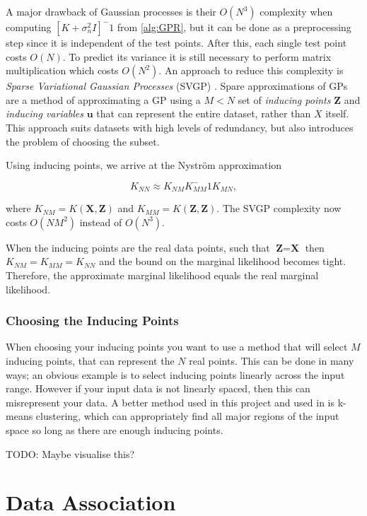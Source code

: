 \documentclass[12pt,a4paper]{report}
\theoremstyle{definition}
\begin{document}
A major drawback of Gaussian processes is their $O(N^3)$ complexity when computing $[K + \sigma_{n}^2I]^-1$ from \ref{alg:GPR}, but it can be done as a preprocessing step since it is independent of the test points. 
After this, each single test point costs $O(N)$. 
To predict its variance it is still necessary to perform matrix multiplication which costs $O(N^2)$.
An approach to reduce this complexity is \emph{Sparse Variational Gaussian Processes} (SVGP) \citep{Hensman2014}.
Spare approximations of GPs are a method of approximating a GP using a $M < N$ set of \emph{inducing points} $\textbf{Z}$ and \emph{inducing variables} $\textbf{u}$ that can represent the entire dataset, rather than $X$ itself. 
This approach suits datasets with high levels of redundancy, but also introduces the problem of choosing the subset.

Using inducing points, we arrive at the Nystr{\"o}m approximation

\begin{equation}
	K_{NN} \approx K_{NM} K_{MM}^-1 K_{MN},
\end{equation}

where $K_{NM} = K(\textbf{X}, \textbf{Z})$ and $K_{MM} = K(\textbf{Z}, \textbf{Z})$.
The SVGP complexity now costs $O(NM^2)$ instead of $O(N^3)$.

When the inducing points are the real data points, such that $\textbf{Z} = \textbf{X}$ then $K_{NM} = K_{MM} = K_{NN}$ and the bound on the marginal likelihood becomes tight. 
Therefore, the approximate marginal likelihood equals the real marginal likelihood.

\subsubsection{Choosing the Inducing Points}

When choosing your inducing points you want to use a method that will select $M$ inducing points, that can represent the $N$ real points.
This can be done in many ways; an obvious example is to select inducing points linearly across the input range. 
However if your input data is not linearly spaced, then this can misrepresent your data.
A better method used in this project and used in \citet{Hensman2014} is k-means clustering, which can appropriately find all major regions of the input space so long as there are enough inducing points.

TODO: Maybe visualise this?

\section{Data Association}
\end{document}
